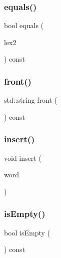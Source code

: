 \subsubsection{\texorpdfstring{equals()}{equals()}}
{\footnotesize\ttfamily bool equals (\begin{DoxyParamCaption}\item[{const \mbox{\hyperlink{classDawgLexicon}{Dawg\+Lexicon}} \&}]{lex2 }\end{DoxyParamCaption}) const}

\mbox{\label{classDawgLexicon_a054217ec9f3229ceedee9d7bde075587}} 
\subsubsection{\texorpdfstring{front()}{front()}}
{\footnotesize\ttfamily std\+::string front (\begin{DoxyParamCaption}{ }\end{DoxyParamCaption}) const}

\mbox{\label{classDawgLexicon_a1a017af6eb755b5c83e70f61e2bda2c7}} 
\subsubsection{\texorpdfstring{insert()}{insert()}}
{\footnotesize\ttfamily void insert (\begin{DoxyParamCaption}\item[{const std\+::string \&}]{word }\end{DoxyParamCaption})}

\mbox{\label{classDawgLexicon_acf82f9b2937375c7b1cf3dccb3df3312}} 
\subsubsection{\texorpdfstring{is\+Empty()}{isEmpty()}}
{\footnotesize\ttfamily bool is\+Empty (\begin{DoxyParamCaption}{ }\end{DoxyParamCaption}) const}

